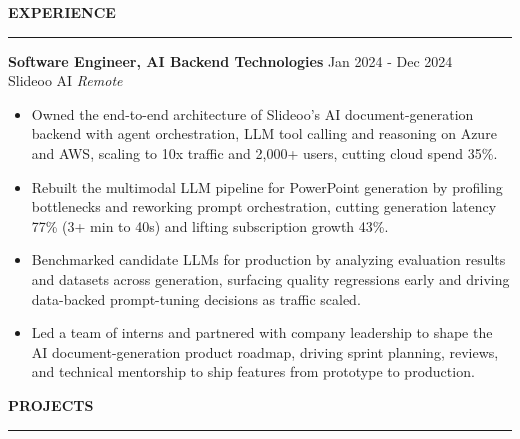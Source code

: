 \documentclass{resume}
\newcommand{\bulletgap}{-3pt}   %
\newcommand{\headergap}{-3pt}   %
\def\sectionskip{\vspace{12pt}}     %
\renewenvironment{rSection}[1]{%
  \sectionskip
  {\large\bfseries\MakeUppercase{#1}}%
  \sectionlineskip
  \hrule
  \begin{list}{}{\setlength{\leftmargin}{0em}}
  \item[]
}{%
  \end{list}
  \vspace{-0.5em}
}
\begin{document}
\begin{rSection}{Experience}
\newpage
\textbf{Software Engineer, AI Backend Technologies} \hfill Jan 2024 - Dec 2024\\
Slideoo AI \hfill \textit{Remote}%
\vspace{\headergap}
\begin{itemize}[leftmargin=0.15in]
    \itemsep \bulletgap {}
    \item Owned the end-to-end architecture of Slideoo's AI document-generation backend with agent orchestration, LLM tool calling and reasoning on Azure and AWS, scaling to 10x traffic and 2,000+ users, cutting cloud spend 35\%.
    \item Rebuilt the multimodal LLM pipeline for PowerPoint generation by profiling bottlenecks and reworking prompt orchestration, cutting generation latency 77\% (3+ min to 40s) and lifting subscription growth 43\%.
    \item Benchmarked candidate LLMs for production by analyzing evaluation results and datasets across generation, surfacing quality regressions early and driving data-backed prompt-tuning decisions as traffic scaled.
    \item Led a team of interns and partnered with company leadership to shape the AI document-generation product roadmap, driving sprint planning, reviews, and technical mentorship to ship features from prototype to production.
\end{itemize}
\begin{rSection}{Projects}


\end{rSection}
\end{rSection}
\end{document}

